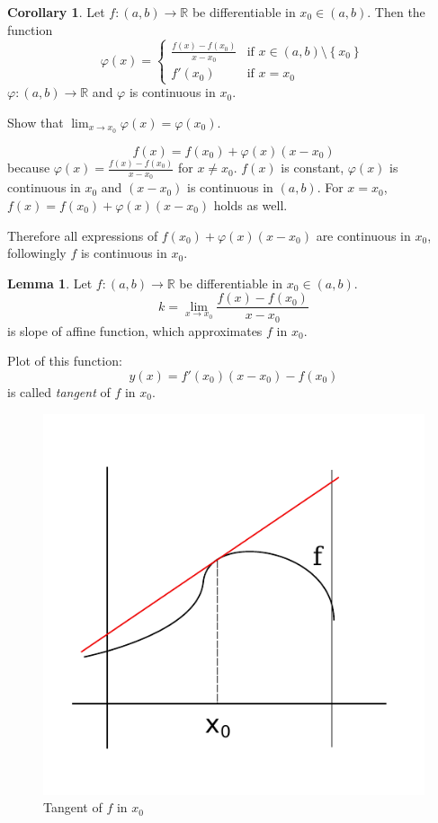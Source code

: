 \documentclass[a4paper,landscape,twocolumn]{article}
\theoremstyle{definition}
\newtheorem{cor}{Corollary}
\newtheorem{lemma}{Lemma}
\newcommand\set[1]{\left\{#1\right\}}
\begin{document}
%
\begin{cor}
  Let $f: (a, b) \to \mathbb R$ be differentiable in $x_0 \in (a, b)$. Then
  the function
  \[
    \varphi(x) = \begin{cases}
      \frac{f(x) - f(x_0)}{x - x_0} & \text{if } x \in (a, b) \setminus \set{x_0} \\
      f'(x_0) & \text{if } x = x_0
    \end{cases}
  \]
  $\varphi: (a,b) \to \mathbb R$ and $\varphi$ is continuous in $x_0$.

  Show that $\lim_{x\to x_0} \varphi(x) = \varphi(x_0)$.

  \[ f(x) = f(x_0) + \varphi(x)(x - x_0) \]
  because $\varphi(x) = \frac{f(x) - f(x_0)}{x - x_0}$ for $x \neq x_0$.
  $f(x)$ is constant, $\varphi(x)$ is continuous in $x_0$ and $(x - x_0)$ is continuous in $(a, b)$.
  For $x = x_0$, $f(x) = f(x_0) + \varphi(x)(x - x_0)$ holds as well.

  Therefore all expressions of $f(x_0) + \varphi(x)(x - x_0)$ are continuous in $x_0$,
  followingly $f$ is continuous in $x_0$.
\end{cor}
\begin{lemma}
  Let $f: (a, b) \to \mathbb R$ be differentiable in $x_0 \in (a, b)$.
  \[ k = \lim_{x \to x_0} \frac{f(x) - f(x_0)}{x - x_0} \]
  is slope of affine function, which approximates $f$ in $x_0$.

  Plot of this function:
  \[ y(x) = f'(x_0) (x - x_0) - f(x_0) \]
  is called \emph{tangent} of $f$ in $x_0$.

  \begin{figure}[t]
    \begin{center}
      \includegraphics{img/tangent.pdf}
      \caption{Tangent of $f$ in $x_0$}
    \end{center}
  \end{figure}
\end{lemma}
\end{document}
